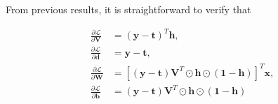 \documentclass{article}
\begin{document}
From previous results, it is straightforward to verify that

\begin{equation}
\begin{split}
    \frac{\partial \mathcal{L}}{\partial \mathbf{V}} &=
        (\mathbf{y} - \mathbf{t})^T\mathbf{h}, \\
    \frac{\partial \mathcal{L}}{\partial \mathbf{d}} &=
        \mathbf{y} - \mathbf{t}, \\
    \frac{\partial \mathcal{L}}{\partial \mathbf{W}} &=
        \left[
            (\mathbf{y} - \mathbf{t}) \mathbf{V}^T
            \odot \mathbf{h} \odot (\mathbf{1} - \mathbf{h})
        \right]^T \mathbf{x}, \\
    \frac{\partial \mathcal{L}}{\partial \mathbf{b}} &=
        (\mathbf{y} - \mathbf{t}) \mathbf{V}^T
        \odot \mathbf{h} \odot (\mathbf{1} - \mathbf{h}) \\
\end{split}
\end{equation}
\end{document}

